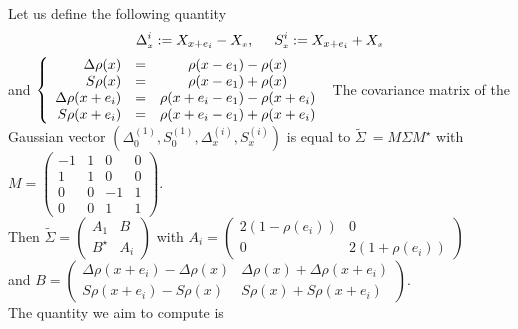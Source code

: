\documentclass[12pt]{article}
\renewcommand{\tilde}{\widetilde}
\theoremstyle{Theorem}
\begin{document}
Let us define the following quantity  \begin{equation} \label{expressions} \Delta^{i}_{\scriptscriptstyle x} := X_{x+e_i} - X_{\scriptscriptstyle x}, \hspace{0.5cm} S^{i}_{\scriptscriptstyle x} := X_{x+e_i} + X_{\scriptscriptstyle x}\end{equation} and 
{\small
$\left\{\begin{array}{rlc}
\Delta \rho(x) & = & \rho(x-e_1)-\rho(x) \\
S\rho(x) & = & \rho(x-e_1)+\rho(x)\\
\Delta \rho(x+e_i) & = & \rho(x+e_i-e_1)-\rho(x+e_i) \\
S\rho(x+e_i) & = & \rho(x+e_i-e_1)+\rho(x+e_i)\\
\end{array}\right.\\
$
}
The covariance matrix of the Gaussian vector $\left(\Delta^{\scriptscriptstyle (1)}_{\scriptscriptstyle 0}, S^{\scriptscriptstyle (1)}_{\scriptscriptstyle 0}, \Delta^{\scriptscriptstyle (i)}_{\scriptscriptstyle x}, S^{\scriptscriptstyle (i)}_{\scriptscriptstyle x}\right)$ is equal to ${\tilde{\Sigma}~= M\Sigma M^{\star}}$ with {\small $M = \begin{pmatrix}
-1 & 1 & 0 &  0 \\
1 & 1 & 0 &  0 \\
0& 0 & -1 &  1 \\
0 & 0 & 1 & 1
\end{pmatrix}$}. \\
Then $\tilde{\Sigma} = \begin{pmatrix} A_{1} & B \\ B^{\star} & A_{i} \end{pmatrix}$
with 
$A_{i} = \begin{pmatrix} 2(1-\rho(e_i)) & 0 \\ 0 & 2(1+\rho(e_i))\end{pmatrix}$ \\
and {\small $B = \begin{pmatrix} \Delta \rho(x+e_i) - \Delta \rho(x)&    \Delta \rho(x) + \Delta \rho(x+e_i) \\ 
 S\rho(x+e_i)- S\rho(x) &  S\rho(x) + S\rho(x+e_i) 
 \end{pmatrix}$}. \\
The quantity we aim to compute is 
\end{document}
